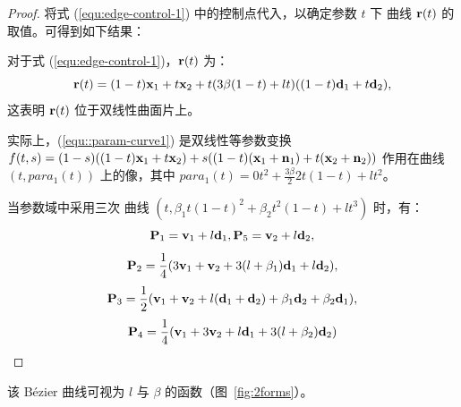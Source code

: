 \begin{proof}
将式 (\ref{equ:edge-control-1}) 中的控制点代入，以确定参数 $t$ 下 \Bezier 曲线 $\mathbf{r}(t)$ 的取值。可得到如下结果：

对于式 (\ref{equ:edge-control-1})，$\mathbf{r}(t)$ 为：
\begin{equation}\label{equ::param-curve1}
\mathbf{r}(t)=(1-t) \mathbf{x}_1+t \mathbf{x}_2+t (3\beta(1-t)+l t)((1-t)\mathbf{d}_1+t\mathbf{d}_2),
\end{equation}
这表明 $\mathbf{r}(t)$ 位于双线性曲面片上。

实际上，(\ref{equ::param-curve1}) 是双线性等参数变换
$f(t,s)=(1-s)((1-t)\mathbf{x}_1+t \mathbf{x}_2)+s((1-t)(\mathbf{x}_1+\mathbf{n}_1)+t(\mathbf{x}_2+\mathbf{n}_2))$
作用在曲线 $(t,para_1(t))$ 上的像，其中
$para_1(t)=0 t^2+\frac{3\beta}{2} 2t(1-t)+l t^2$。

当参数域中采用三次 \Bezier 曲线
$(t,\beta_1 t(1-t)^2+\beta_2 t^2(1-t)+l t^3)$ 时，有：
$$\mathbf{P}_1=\mathbf{v}_1+l \mathbf{d}_1,\mathbf{P}_5=\mathbf{v}_2+l \mathbf{d}_2,$$
$$\mathbf{P}_2=\frac{1}{4}(3\mathbf{v}_1+\mathbf{v}_2 +3(l+\beta_1) \mathbf{d}_1+l \mathbf{d}_2),$$
$$\mathbf{P}_3=\frac{1}{2}(\mathbf{v}_1+\mathbf{v}_2+l(\mathbf{d}_1+\mathbf{d}_2)+\beta_1 \mathbf{d}_2+\beta_2 \mathbf{d}_1),$$
$$\mathbf{P}_4=\frac{1}{4}(\mathbf{v}_1+3\mathbf{v}_2+l \mathbf{d}_1+3(l+\beta_2)\mathbf{d}_2)$$
\end{proof}
该 B\'{e}zier 曲线可视为 $l$ 与 $\beta$ 的函数（图~\ref{fig:2forms}）。



